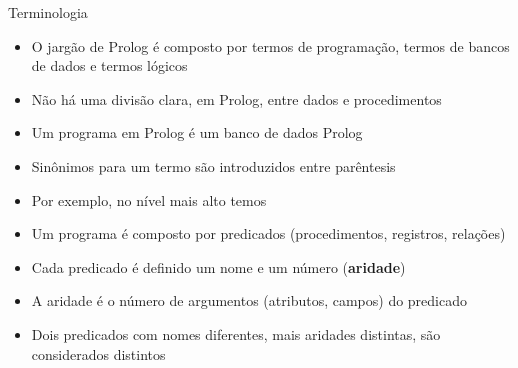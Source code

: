 \begin{frame}[fragile]{Terminologia}

    \begin{itemize}
        \item O jargão de Prolog é composto por termos de programação, termos de bancos de 
            dados e termos lógicos

        \item Não há uma divisão clara, em Prolog, entre dados e procedimentos

        \item Um programa em Prolog é um banco de dados Prolog

        \item Sinônimos para um termo são introduzidos entre parêntesis

        \item Por exemplo, no nível mais alto temos 

        \item Um programa é composto por predicados (procedimentos, registros, relações)

        \item Cada predicado é definido um nome e um número (\textbf{aridade})

        \item A aridade é o número de argumentos (atributos, campos) do predicado

        \item Dois predicados com nomes diferentes, mais aridades distintas, são considerados 
            distintos
    \end{itemize}

\end{frame}

